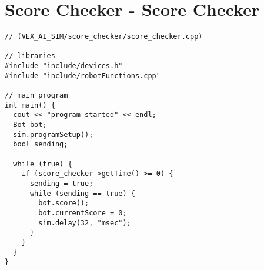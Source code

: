 \section*{Score Checker - Score Checker}
\begin{verbatim}
// (VEX_AI_SIM/score_checker/score_checker.cpp)
 
// libraries
#include "include/devices.h"
#include "include/robotFunctions.cpp"
 
// main program
int main() {
  cout << "program started" << endl;
  Bot bot;
  sim.programSetup();
  bool sending;
 
  while (true) {
    if (score_checker->getTime() >= 0) {
      sending = true;
      while (sending == true) {
        bot.score();
        bot.currentScore = 0;
        sim.delay(32, "msec");
      }
    }
  }
}
\end{verbatim}
